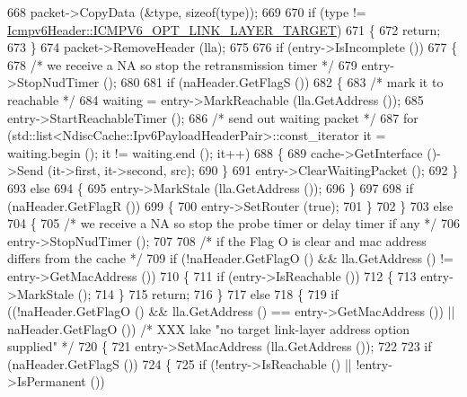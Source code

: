 \begin{DoxyCode}
668   packet->CopyData (&type, \textcolor{keyword}{sizeof}(type));
669 
670   \textcolor{keywordflow}{if} (type != \hyperlink{classns3_1_1Icmpv6Header_a1992e0e28c453f5e23b1ad55a49b7908a9a014e199d5c5492a04523cf04938b26}{Icmpv6Header::ICMPV6\_OPT\_LINK\_LAYER\_TARGET})
671     \{
672       \textcolor{keywordflow}{return};
673     \}
674   packet->RemoveHeader (lla);
675 
676   \textcolor{keywordflow}{if} (entry->IsIncomplete ())
677     \{
678       \textcolor{comment}{/* we receive a NA so stop the retransmission timer */}
679       entry->StopNudTimer ();
680 
681       \textcolor{keywordflow}{if} (naHeader.GetFlagS ())
682         \{
683           \textcolor{comment}{/* mark it to reachable */}
684           waiting = entry->MarkReachable (lla.GetAddress ());
685           entry->StartReachableTimer ();
686           \textcolor{comment}{/* send out waiting packet */}
687           \textcolor{keywordflow}{for} (std::list<NdiscCache::Ipv6PayloadHeaderPair>::const\_iterator it = waiting.begin (); it != 
      waiting.end (); it++)
688             \{
689               cache->GetInterface ()->Send (it->first, it->second, src);
690             \}
691           entry->ClearWaitingPacket ();
692         \}
693       \textcolor{keywordflow}{else}
694         \{
695           entry->MarkStale (lla.GetAddress ());
696         \}
697 
698       \textcolor{keywordflow}{if} (naHeader.GetFlagR ())
699         \{
700           entry->SetRouter (\textcolor{keyword}{true});
701         \}
702     \}
703   \textcolor{keywordflow}{else}
704     \{
705       \textcolor{comment}{/* we receive a NA so stop the probe timer or delay timer if any */}
706       entry->StopNudTimer ();
707 
708       \textcolor{comment}{/* if the Flag O is clear and mac address differs from the cache */}
709       \textcolor{keywordflow}{if} (!naHeader.GetFlagO () && lla.GetAddress () != entry->GetMacAddress ())
710         \{
711           \textcolor{keywordflow}{if} (entry->IsReachable ())
712             \{
713               entry->MarkStale ();
714             \}
715           \textcolor{keywordflow}{return};
716         \}
717       \textcolor{keywordflow}{else}
718         \{
719           \textcolor{keywordflow}{if} ((!naHeader.GetFlagO () && lla.GetAddress () == entry->GetMacAddress ()) || naHeader.GetFlagO 
      ()) \textcolor{comment}{/* XXX lake "no target link-layer address option supplied" */}
720             \{
721               entry->SetMacAddress (lla.GetAddress ());
722 
723               \textcolor{keywordflow}{if} (naHeader.GetFlagS ())
724                 \{
725                   \textcolor{keywordflow}{if} (!entry->IsReachable () || !entry->IsPermanent ())

\end{DoxyCode}
